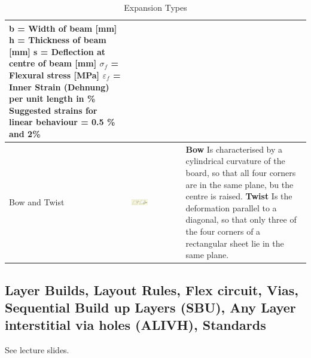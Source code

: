 \begin{table}[h!]
\begin{tabular}{|m{}|m{}|m{}|}
				b = Width of beam [mm] \newline
				h = Thickness of beam [mm]\newline
				s = Deflection at centre of beam [mm]\newline
				$\sigma_f$ = Flexural stress [MPa]\newline
				$\varepsilon_f$ = Inner Strain (Dehnung) per unit length in \% \newline
				Suggested strains for linear behaviour = 0.5 \% and 2\%
			\\
		\hline
				Bow and Twist
			& 
				 \begin{center}\includegraphics[width=0.35\textwidth]{images/BowTwist.png}\end{center}  
			&
				\textbf{Bow}\newline
				Is characterised by a cylindrical curvature of the board, so that all four corners are in the same plane, bu the centre is raised. \newline
				\textbf{Twist}\newline
				Is the deformation parallel to a diagonal, so that only three of the four corners of a rectangular sheet lie in the same plane. 
			\\
		\hline
		\end{tabular}
		
		\caption{Expansion Types}
		\label{Tab:ExpansionTypes}
		\end{table}
	\subsection{Layer Builds, Layout Rules, Flex circuit, Vias, Sequential Build up Layers (SBU), Any Layer interstitial via holes (ALIVH), Standards}
	See lecture slides. 
